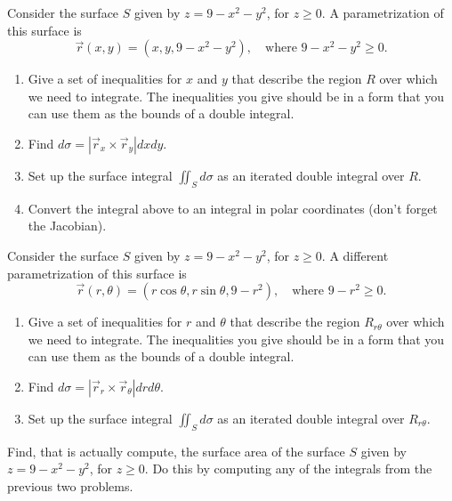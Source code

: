 \begin{problem}
 Consider the surface $S$ given by $z=9-x^2-y^2$, for $z\geq 0$. A parametrization of this surface is $$\vec r(x,y) = (x,y,9-x^2-y^2),\quad \text{where } 9-x^2-y^2\geq 0.$$ 
\begin{enumerate}
 \item Give a set of inequalities for $x$ and $y$ that describe the region $R$ over which we need to integrate. The inequalities you give should be in a form that you can use them as the bounds of a double integral.
 \item Find $d\sigma = \left|\vec r_x\times \vec r_y\right|dxdy$.
 \item Set up the surface integral $\iint_S d\sigma$ as an iterated double integral over $R$. 
 \item Convert the integral above to an integral in polar coordinates (don't forget the Jacobian).
\end{enumerate}
\end{problem}


\begin{problem}
 Consider the surface $S$ given by $z=9-x^2-y^2$, for $z\geq 0$. A different parametrization of this surface is $$\vec r(r,\theta) = (r\cos\theta,r\sin\theta,9-r^2),\quad \text{where } 9-r^2\geq 0.$$ 
\begin{enumerate}
 \item Give a set of inequalities for $r$ and $\theta$ that describe the region $R_{r\theta}$ over which we need to integrate. The inequalities you give should be in a form that you can use them as the bounds of a double integral.
 \item Find $d\sigma = \left|\vec r_r\times \vec r_\theta \right|drd\theta$.
 \item Set up the surface integral $\iint_S d\sigma$ as an iterated double integral over $R_{r\theta}$. 
\end{enumerate}
\end{problem}



\begin{problem}
 Find, that is actually compute, the surface area of the surface $S$ given by $z=9-x^2-y^2$, for $z\geq 0$. Do this by computing any of the integrals from the previous two problems.
\end{problem}

